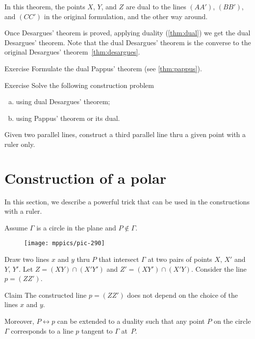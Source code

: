 In this theorem, the points $X$, $Y$, and $Z$ 
are dual to the lines $(AA')$, $(BB')$, and $(CC')$ in the original formulation, and the other way around.

Once Desargues' theorem is proved, applying duality (\ref{thm:dual})
we get the dual Desargues' theorem.
Note that the dual Desargues' theorem is the converse to the original Desargues' theorem~\ref{thm:desargues}.

\begin{thm}{Exercise}\label{ex:dual-pappus}
Formulate the dual Pappus' theorem (see \ref{thm:pappus}).
\end{thm}

\begin{thm}{Exercise}\label{ex:dual-desargues-construction} 
Solve the following construction problem
\begin{enumerate}[(a)]
\item\label{ex:dual-desargues-construction:desargues} using dual Desargues' theorem;
\item\label{ex:dual-desargues-construction:pappus} using Pappus' theorem or its dual.
\end{enumerate}
Given two parallel lines, construct a third parallel line thru a given point with a ruler only.
\end{thm}

\section{Construction of a polar}

In this section, we describe a powerful trick that can be used in the constructions with a ruler.

Assume $\Gamma$ is a circle in the plane and $P\notin \Gamma$.
\begin{figure}[!ht]
\centering
\texttt{[image: mppics/pic-290]}
\end{figure}
Draw two lines $x$ and $y$ thru $P$ that intersect $\Gamma$ at two pairs of points $X$, $X'$ and $Y$, $Y'$.
Let $Z=(XY)\cap(X'Y')$ and $Z'=(XY')\cap(X'Y)$.
Consider the line $p=(ZZ')$.

\begin{thm}{Claim}\label{clm:polar}
The constructed line $p=(ZZ')$ does not depend on the choice of the lines $x$ and $y$.

Moreover, $P\leftrightarrow p$ can be extended to a duality such that any point $P$ on the circle $\Gamma$ corresponds to a line $p$ tangent to $\Gamma$ at~$P$. 
\end{thm}

